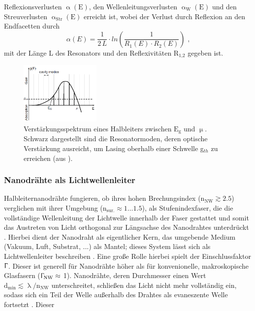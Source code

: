 Reflexionsverlusten $\upalpha (\text{E})$, den Wellenleitungsverlusten
$\upalpha_\text{W}(\text{E})$ und den Streuverlusten
$\upalpha_\text{Str}(\text{E})$ erreicht ist, wobei der Verlust durch Reflexion
an den Endfacetten durch \begin{equation} \alpha(E)=\frac{1}{2\,L}\cdot
ln\left(\frac{1}{R_1(E)\cdot R_2(E)}\right) \text{ ,} \end{equation} mit der
Länge L des Resonators und den Reflexivitäten $\text{R}_\text{1,2}$ gegeben ist.
\begin{figure}[b]
\includegraphics[width=0.35\textwidth]{Bilder/Vorbetrachtung/moden}
\caption[Verstärkungsspektrum eines Halbleiters]{Verstärkungsspektrum eines
Halbleiters zwischen $\text{E}_\text{g}$ und $\upmu$. Schwarz dargestellt sind
die Resonatormoden, deren optische Verstärkung ausreicht, um Lasing oberhalb
einer Schwelle g$_{th}$ zu erreichen (aus \cite{Zapf.Master}).} \label{moden}
\end{figure} \subsubsection{Nanodrähte als Lichtwellenleiter}
Halbleiternanodrähte fungieren, ob ihres hohen Brechungsindex
($\text{n}_\text{NW} \gtrsim 2.5$) verglichen mit ihrer Umgebung
($\text{n}_\text{sur.} \approx 1\ldots 1.5$), als Stufenindexfaser, die die
vollständige Wellenleitung der Lichtwelle innerhalb der Faser gestattet und
somit das Austreten von Licht orthogonal zur Längsachse des Nanodrahtes
unterdrückt \cite{Yao.2009}. Hierbei dient der Nanodraht als eigentlicher Kern,
das umgebende Medium (Vakuum, Luft, Substrat, ...) als Mantel; dieses System
lässt sich als Lichtwellenleiter beschreiben \cite{Pan.2005}. Eine große Rolle
hierbei spielt der Einschlussfaktor $\Upgamma$. Dieser ist generell für
Nanodrähte höher als für konvenionelle, makroskopische Glasfasern
($\Upgamma_\text{NW} \approx$ 1). Nanodrähte, deren Durchmesser einen Wert
$\text{d}_\text{min}\lesssim \uplambda / \text{n}_\text{NW}$ unterschreitet,
schließen das Licht nicht mehr vollständig ein, sodass sich ein Teil der Welle
außerhalb des Drahtes als evaneszente Welle fortsetzt \cite{Voss.2007}. Dieser

